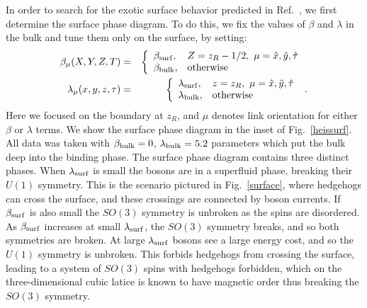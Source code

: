 \documentclass[prb,twocolumn]{revtex4-1}
\begin{document}
In order to search for the exotic surface behavior predicted in Ref.~, we first determine the surface phase diagram.
To do this, we fix the values of $\beta$ and $\lambda$ in the bulk and tune them only on the surface, by setting:
\begin{eqnarray}
\beta_\mu(X,Y,Z,T) &=&
\left\{
\begin{array}{ll}
\beta_{\rm surf}, & Z = z_R - 1/2, ~\mu=\hat{x},\hat{y},\hat{\tau}\\
\beta_{\rm bulk}, & {\rm otherwise}
\end{array}\right. ~
\label{bulkvsurf} \\
\lambda_\mu(x,y,z,\tau) &=&
\left\{
\begin{array}{ll}
\lambda_{\rm surf}, & z = z_R, ~\mu=\hat{x},\hat{y},\hat{\tau}\\
\lambda_{\rm bulk}, & {\rm otherwise }
\end{array}\right. ~.
\label{bulkvsurf}
\end{eqnarray}
Here we focused on the boundary at $z_R$, and $\mu$ denotes link orientation for either $\beta$ or $\lambda$ terms.  We show the surface phase diagram in the inset of Fig.~\ref{heissurf}.  All data was taken with $\beta_{\rm bulk}=0$, $\lambda_{\rm bulk}=5.2$ parameters which put the bulk deep into the binding phase.  The surface phase diagram contains three distinct phases. When $\lambda_{\rm surf}$ is small the bosons are in a superfluid phase, breaking their $U(1)$ symmetry. This is the scenario pictured in Fig.~\ref{surface}, where hedgehogs can cross the surface, and these crossings are connected by boson currents. If $\beta_{\rm surf}$ is also small the $SO(3)$ symmetry is unbroken as the spins are disordered. As $\beta_{\rm surf}$ increases at small $\lambda_{\rm surf}$, the $SO(3)$ symmetry breaks, and so both symmetries are broken. At large $\lambda_{\rm surf}$ bosons see a large energy cost, and so the $U(1)$ symmetry is unbroken. This forbids hedgehogs from crossing the surface, leading to a system of $SO(3)$ spins with hedgehogs forbidden, which on the three-dimensional cubic latice is known to have magnetic order thus breaking the $SO(3)$ symmetry.\cite{LauDasgupta, LesikAshvin} 
\end{document}
